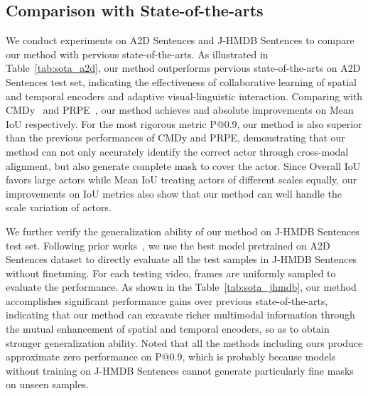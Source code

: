 \documentclass[final]{cvpr}
\begin{document}
\subsection{Comparison with State-of-the-arts}
We conduct experiments on A2D Sentences and J-HMDB Sentences to compare our method with pervious state-of-the-arts. 
As illustrated in Table~\ref{tab:sota_a2d}, our method outperforms pervious state-of-the-arts on A2D Sentences test set, indicating the effectiveness of collaborative learning of spatial and temporal encoders and adaptive visual-linguistic interaction. 
Comparing with CMDy~\cite{wang2020context} and PRPE~\cite{ning2020polar}, our method achieves  and  absolute improvements on Mean IoU respectively. 
For the most rigorous metric P@0.9, our method is also superior than the previous performances of CMDy and PRPE, demonstrating that our method can not only accurately identify the correct actor through cross-modal alignment, but also generate complete mask to cover the actor. 
Since Overall IoU favors large actors while Mean IoU treating actors of different scales equally, our improvements on IoU metrics also show that our method can well handle the scale variation of actors.

We further verify the generalization ability of our method on J-HMDB Sentences test set. 
Following prior works~\cite{ning2020polar, wang2020context, wang2019asymmetric}, we use the best model pretrained on A2D Sentences dataset to directly evaluate all the test samples in J-HMDB Sentences without finetuning. 
For each testing video,  frames are uniformly sampled to evaluate the performance. 
As shown in the Table~\ref{tab:sota_jhmdb}, our method accomplishes significant performance gains over previous state-of-the-arts, indicating that our method can excavate richer multimodal information through the mutual enhancement of spatial and temporal encoders, so as to obtain stronger generalization ability. 
Noted that all the methods including ours produce approximate zero performance on P@0.9, which is probably because models without training on J-HMDB Sentences cannot generate particularly fine masks on unseen samples.
\end{document}
